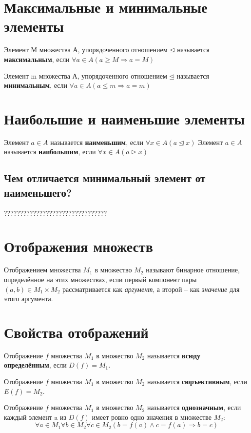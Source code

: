 \documentclass[a4paper]{article}
\begin{document}
{\begin{small}
\section*{Максимальные и минимальные элементы}
Элемент М множества А, упорядоченного отношением $\unlhd$ называется \textbf{максимальным}, если $\forall a \in A (a \geq M \Rightarrow a = M)$

Элемент m множества А, упорядоченного отношением $\unlhd$ называется \textbf{минимальным}, если $\forall a \in A (a \leq m \Rightarrow a = m)$

\section*{Наибольшие и наименьшие элементы
}
Элемент $a \in A$ называется \textbf{наименьшим}, если $\forall x \in A (a \unlhd x)$\newline
Элемент $a \in A$ называется \textbf{наибольшим}, если $\forall x \in A (a \unrhd x)$

\subsection*{Чем отличается минимальный элемент от наименьшего?}
????????????????????????????????

\section*{Отображения множеств
}

Отображением
множества $M_1$ в множество $M_2$ называют бинарное отношение, определённое на
этих множествах, если первый компонент пары $(a, b) \in M_1 \times M_2$ рассматривается как \textit{аргумент}, а второй – как \textit{значение} для этого аргумента.

\section*{Свойства отображений}

Отображение $f$ множества $M_1$ в множество $M_2$ называется
\textbf{всюду определённым}, если $D(f) = M_1$.

Отображение $f$ множества $M_1$ в множество $M_2$ называется
\textbf{сюръективным}, если $E(f) = M_2$. 

Отображение $f$ множества $M_1$ в множество $M_2$ называется
\textbf{однозначным}, если каждый элемент a из $D(f)$ имеет ровно одно значения в множестве $M_2$:
\begin{equation}
\forall a \in M_1 \forall b \in M_2 \forall c \in M_2 (b  = f(a) \land c = f(a) \Rightarrow b = c)
\end{equation}



\end{small}}
\end{document}
